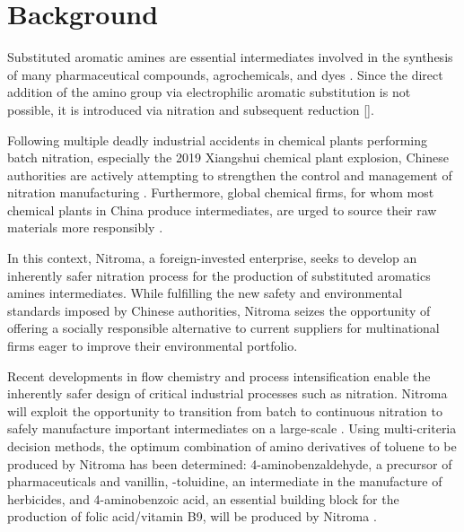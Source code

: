 \section*{Background}

Substituted aromatic amines are essential intermediates involved in the synthesis of many pharmaceutical compounds, agrochemicals, and dyes \cite{vogt_amines_2000}. Since the direct addition of the amino group via electrophilic aromatic substitution is not possible, it is introduced via nitration and subsequent reduction []. 

Following multiple deadly industrial accidents in chemical plants performing batch nitration, especially the 2019 Xiangshui chemical plant explosion, Chinese authorities are actively attempting to strengthen the control and management of nitration manufacturing \cite{el_diario_china_2019}. Furthermore, global chemical firms, for whom most chemical plants in China produce intermediates, are urged to source their raw materials more responsibly \cite{stanway_global_2019}.


In this context, Nitroma, a foreign-invested enterprise, seeks to develop an inherently safer nitration process for the production of substituted aromatics amines intermediates. While fulfilling the new safety and environmental standards imposed by Chinese authorities, Nitroma seizes the opportunity of offering a socially responsible alternative to current suppliers for multinational firms eager to improve their environmental portfolio. 

Recent developments in flow chemistry and process intensification enable the inherently safer design of critical industrial processes such as nitration. Nitroma will exploit the opportunity to transition from batch to continuous nitration to safely manufacture important intermediates on a large-scale \cite{di_miceli_raimondi_safety_2015}. Using multi-criteria decision methods, the optimum combination of amino derivatives of toluene to be produced by Nitroma has been determined: 4-aminobenzaldehyde, a precursor of pharmaceuticals and vanillin, \ortho-toluidine, an intermediate in the manufacture of herbicides, and 4-aminobenzoic acid, an essential building block for the production of folic acid/vitamin B9, will be produced by Nitroma \cite{bowers_toluidines_2000,bruhne_benzaldehyde_2011,maki_benzoic_2000}.

